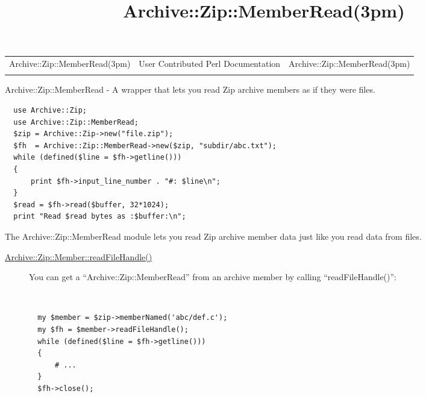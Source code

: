 \documentclass[]{article}
\title{Archive::Zip::MemberRead(3pm)}
\author{}
\date{}
\renewcommand{\emph}[1]{\underline{#1}}
\begin{document}
\maketitle

\begin{longtable}[c]{@{}lll@{}}
\toprule\addlinespace
Archive::Zip::MemberRead(3pm) & User Contributed Perl Documentation &
Archive::Zip::MemberRead(3pm)
\\\addlinespace
\bottomrule
\end{longtable}


Archive::Zip::MemberRead - A wrapper that lets you read Zip archive
members as if they were files.


\begin{verbatim}
  use Archive::Zip;
  use Archive::Zip::MemberRead;
  $zip = Archive::Zip->new("file.zip");
  $fh  = Archive::Zip::MemberRead->new($zip, "subdir/abc.txt");
  while (defined($line = $fh->getline()))
  {
      print $fh->input_line_number . "#: $line\n";
  }
  $read = $fh->read($buffer, 32*1024);
  print "Read $read bytes as :$buffer:\n";
\end{verbatim}


The Archive::Zip::MemberRead module lets you read Zip archive member
data just like you read data from files.


\begin{description}
\item[\emph{Archive::Zip::Member::readFileHandle()}]
You can get a ``Archive::Zip::MemberRead'' from an archive member by
calling ``readFileHandle()'':

~

\begin{verbatim}
  my $member = $zip->memberNamed('abc/def.c');
  my $fh = $member->readFileHandle();
  while (defined($line = $fh->getline()))
  {
      # ...
  }
  $fh->close();
    
\end{verbatim}
\end{description}
\end{document}
